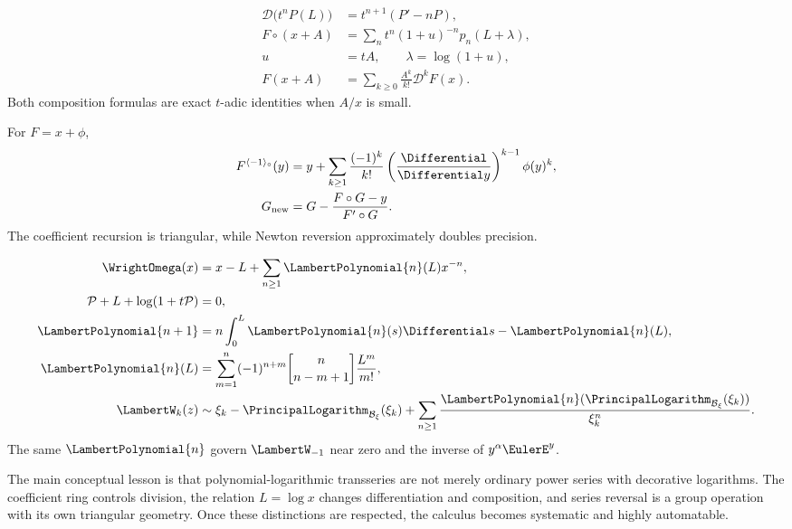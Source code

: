 \documentclass[11pt]{article}
\theoremstyle{pltheorem}
\newcommand{\rev}{\langle-1\rangle_{\circ}}
\newcommand{\stirlingone}[2]{\genfrac{[}{]}{0pt}{}{#1}{#2}}
\newcommand{\D}{\mathcal D}
\newcommand{\compose}{\mathbin{\circ}}
\newcommand{\LogarithmOnBranch}[2]{%
  \PrincipalLogarithm_{#1}\!\left(#2\right)%
}
\begin{document}
\begin{keybox}
\begin{align*}
 \D\bigl(t^nP(L)\bigr)&=t^{n+1}(P'-nP),\\
 F\compose(x+A)
 &=\sum_n t^n(1+u)^{-n}p_n(L+\lambda),\\
 u&=tA,\qquad \lambda=\log(1+u),\\
 F(x+A)&=\sum_{k\ge0}\frac{A^k}{k!}\D^kF(x).
\end{align*}
Both composition formulas are exact \(t\)-adic identities when \(A/x\) is small.
\end{keybox}

\begin{keybox}
For \(F=x+\phi\),
\begin{align*}
 F^{\rev}(y)
 &=y+\sum_{k\ge1}\frac{(-1)^k}{k!}
 \left(\frac{\Differential}{\Differential y}\right)^{k-1}\phi(y)^k,\\
 G_{\mathrm{new}}
 &=G-\frac{F\compose G-y}{F'\compose G}.
\end{align*}
The coefficient recursion is triangular, while Newton reversion approximately doubles precision.
\end{keybox}

\begin{keybox}
\begin{align*}
 \WrightOmega(x)&=x-L+\sum_{n\ge1}\LambertPolynomial{n}(L)x^{-n},\\
 \mathcal P+L+\log(1+t\mathcal P)&=0,\\
 \LambertPolynomial{n+1}&=n\int_0^L\LambertPolynomial{n}(s)\Differential s-\LambertPolynomial{n}(L),\\
 \LambertPolynomial{n}(L)&=\sum_{m=1}^n(-1)^{n+m}
 \stirlingone{n}{n-m+1}\frac{L^m}{m!},\\
 \LambertW_k(z)&\sim\xi_k-\LogarithmOnBranch{\mathcal B_\xi}{\xi_k}+
 \sum_{n\ge1}\frac{\LambertPolynomial{n}(\LogarithmOnBranch{\mathcal B_\xi}{\xi_k})}{\xi_k^n}.
\end{align*}
The same \(\LambertPolynomial{n}\) govern \(\LambertW_{-1}\) near zero and the inverse of
\(y^\alpha\EulerE^y\).
\end{keybox}

The main conceptual lesson is that polynomial-logarithmic transseries are not merely ordinary power series with decorative logarithms.  The coefficient ring controls division, the relation \(L=\log x\) changes differentiation and composition, and series reversal is a group operation with its own triangular geometry.  Once these distinctions are respected, the calculus becomes systematic and highly automatable.
\end{document}
